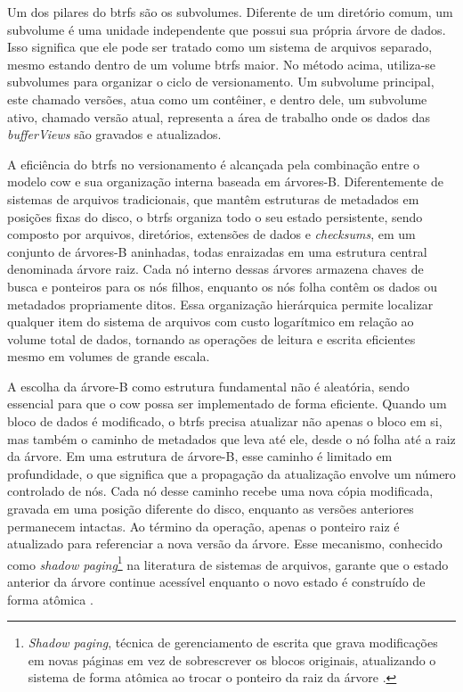 Um dos pilares do \gls{btrfs} são os subvolumes. Diferente de um diretório comum, um
subvolume é uma unidade independente que possui sua própria árvore de dados. Isso
significa que ele pode ser tratado como um sistema de arquivos separado, mesmo
estando dentro de um volume \gls{btrfs} maior. No método acima, utiliza-se
subvolumes para organizar o ciclo de versionamento. Um subvolume principal, este
chamado versões, atua como um contêiner, e dentro dele, um subvolume ativo, chamado
versão atual, representa a área de trabalho onde os dados das \textit{bufferViews}
são gravados e atualizados.

A eficiência do \gls{btrfs} no versionamento é alcançada pela combinação entre o
modelo \gls{cow} e sua organização interna baseada em árvores-B. Diferentemente de
sistemas de arquivos tradicionais, que mantêm estruturas de metadados em posições
fixas do disco, o \gls{btrfs} organiza todo o seu estado persistente, sendo composto
por arquivos, diretórios, extensões de dados e \textit{checksums}, em um conjunto de
árvores-B aninhadas, todas enraizadas em uma estrutura central denominada árvore
raiz. Cada nó interno dessas árvores armazena chaves de busca e ponteiros para os
nós filhos, enquanto os nós folha contêm os dados ou metadados propriamente ditos.
Essa organização hierárquica permite localizar qualquer item do sistema de arquivos
com custo logarítmico em relação ao volume total de dados, tornando as operações de
leitura e escrita eficientes mesmo em volumes de grande escala.

A escolha da árvore-B como estrutura fundamental não é aleatória, sendo essencial
para que o \gls{cow} possa ser implementado de forma eficiente. Quando um bloco de
dados é modificado, o \gls{btrfs} precisa atualizar não apenas o bloco em si, mas
também o caminho de metadados que leva até ele, desde o nó folha até a raiz da
árvore. Em uma estrutura de árvore-B, esse caminho é limitado em profundidade, o que
significa que a propagação da atualização envolve um número controlado de nós. Cada
nó desse caminho recebe uma nova cópia modificada, gravada em uma posição diferente
do disco, enquanto as versões anteriores permanecem intactas. Ao término da
operação, apenas o ponteiro raiz é atualizado para referenciar a nova versão da
árvore. Esse mecanismo, conhecido como \textit{shadow paging}\footnote{\textit{Shadow
paging}, técnica de gerenciamento de escrita que grava modificações em novas páginas
em vez de sobrescrever os blocos originais, atualizando o sistema de forma atômica
ao trocar o ponteiro da raiz da árvore \cite{Rodeh2007}.} na literatura de sistemas
de arquivos, garante que o estado anterior da árvore continue acessível enquanto o
novo estado é construído de forma atômica \cite{Rodeh2007}.

